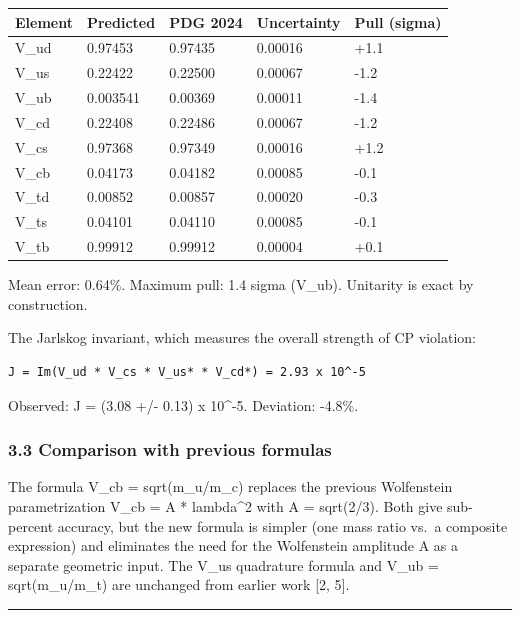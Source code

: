 \documentclass[
]{article}
\newcounter{none} %
\begin{document}
{\def\LTcaptype{none} %
\begin{longtable}[]{@{}lllll@{}}
\toprule\noalign{}
Element & Predicted & PDG 2024 & Uncertainty & Pull (sigma) \\
\midrule\noalign{}
\endhead
\bottomrule\noalign{}
\endlastfoot
V\_ud & 0.97453 & 0.97435 & 0.00016 & +1.1 \\
V\_us & 0.22422 & 0.22500 & 0.00067 & -1.2 \\
V\_ub & 0.003541 & 0.00369 & 0.00011 & -1.4 \\
V\_cd & 0.22408 & 0.22486 & 0.00067 & -1.2 \\
V\_cs & 0.97368 & 0.97349 & 0.00016 & +1.2 \\
V\_cb & 0.04173 & 0.04182 & 0.00085 & -0.1 \\
V\_td & 0.00852 & 0.00857 & 0.00020 & -0.3 \\
V\_ts & 0.04101 & 0.04110 & 0.00085 & -0.1 \\
V\_tb & 0.99912 & 0.99912 & 0.00004 & +0.1 \\
\end{longtable}
}

Mean \textbar error\textbar: 0.64\%. Maximum pull: 1.4 sigma (V\_ub).
Unitarity is exact by construction.

The Jarlskog invariant, which measures the overall strength of CP
violation:

\begin{verbatim}
J = Im(V_ud * V_cs * V_us* * V_cd*) = 2.93 x 10^-5
\end{verbatim}

Observed: J = (3.08 +/- 0.13) x 10\^{}-5. Deviation: -4.8\%.

\subsubsection{3.3 Comparison with previous
formulas}\label{comparison-with-previous-formulas}

The formula V\_cb = sqrt(m\_u/m\_c) replaces the previous Wolfenstein
parametrization V\_cb = A * lambda\^{}2 with A = sqrt(2/3). Both give
sub-percent accuracy, but the new formula is simpler (one mass ratio
vs.~a composite expression) and eliminates the need for the Wolfenstein
amplitude A as a separate geometric input. The V\_us quadrature formula
and V\_ub = sqrt(m\_u/m\_t) are unchanged from earlier work {[}2, 5{]}.

\begin{center}\rule{0.5\linewidth}{0.5pt}\end{center}
\end{document}

